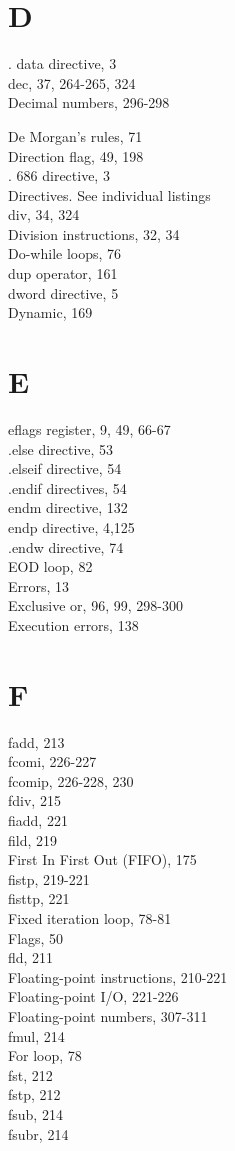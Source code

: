 \documentclass[10pt]{article}
\begin{document}
\section*{D}
. data directive, 3\\
dec, 37, 264-265, 324\\
Decimal numbers, 296-298

De Morgan's rules, 71\\
Direction flag, 49, 198\\
. 686 directive, 3\\
Directives. See individual listings\\
div, 34, 324\\
Division instructions, 32, 34\\
Do-while loops, 76\\
dup operator, 161\\
dword directive, 5\\
Dynamic, 169

\section*{E}
eflags register, 9, 49, 66-67\\
.else directive, 53\\
.elseif directive, 54\\
.endif directives, 54\\
endm directive, 132\\
endp directive, 4,125\\
.endw directive, 74\\
EOD loop, 82\\
Errors, 13\\
Exclusive or, 96, 99, 298-300\\
Execution errors, 138

\section*{F}
fadd, 213\\
fcomi, 226-227\\
fcomip, 226-228, 230\\
fdiv, 215\\
fiadd, 221\\
fild, 219\\
First In First Out (FIFO), 175\\
fistp, 219-221\\
fisttp, 221\\
Fixed iteration loop, 78-81\\
Flags, 50\\
fld, 211\\
Floating-point instructions, 210-221\\
Floating-point I/O, 221-226\\
Floating-point numbers, 307-311\\
fmul, 214\\
For loop, 78\\
fst, 212\\
fstp, 212\\
fsub, 214\\
fsubr, 214
\end{document}
